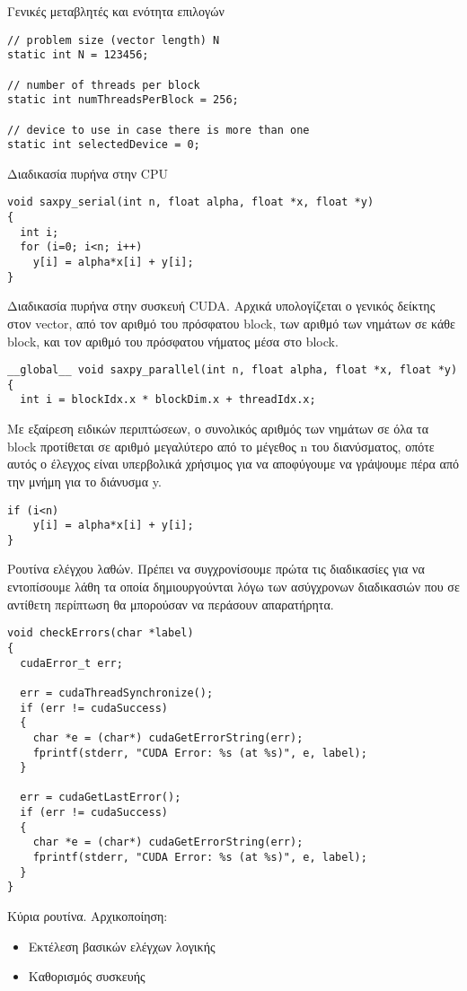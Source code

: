 Γενικές μεταβλητές και ενότητα επιλογών
\begin{lstlisting}[basicstyle=\scriptsize]
// problem size (vector length) N
static int N = 123456;

// number of threads per block
static int numThreadsPerBlock = 256;

// device to use in case there is more than one
static int selectedDevice = 0;

\end{lstlisting}
Διαδικασία πυρήνα στην CPU
\begin{lstlisting}[basicstyle=\scriptsize]
void saxpy_serial(int n, float alpha, float *x, float *y)
{
  int i;
  for (i=0; i<n; i++)
    y[i] = alpha*x[i] + y[i];
}
\end{lstlisting}
Διαδικασία πυρήνα στην συσκευή CUDA. Αρχικά υπολογίζεται ο γενικός δείκτης στον vector, από τον αριθμό του πρόσφατου block, των αριθμό των νημάτων σε κάθε block, και τον αριθμό του πρόσφατου νήματος μέσα στο block. 
\begin{lstlisting}[basicstyle=\scriptsize]
__global__ void saxpy_parallel(int n, float alpha, float *x, float *y)
{
  int i = blockIdx.x * blockDim.x + threadIdx.x;
\end{lstlisting}
Με εξαίρεση ειδικών περιπτώσεων, ο συνολικός αριθμός των νημάτων σε όλα τα block προτίθεται σε αριθμό μεγαλύτερο από το μέγεθος n του διανύσματος, οπότε αυτός ο έλεγχος είναι υπερβολικά χρήσιμος για να αποφύγουμε να γράψουμε πέρα από την μνήμη για το διάνυσμα y.
\begin{lstlisting}[basicstyle=\scriptsize]
  if (i<n)
    y[i] = alpha*x[i] + y[i];
}
\end{lstlisting}
Ρουτίνα ελέγχου λαθών. Πρέπει να συγχρονίσουμε πρώτα τις διαδικασίες για να εντοπίσουμε λάθη τα οποία δημιουργούνται λόγω των ασύγχρονων διαδικασιών που σε αντίθετη περίπτωση θα μπορούσαν να περάσουν απαρατήρητα.
\begin{lstlisting}[basicstyle=\scriptsize]
void checkErrors(char *label)
{
  cudaError_t err;

  err = cudaThreadSynchronize();
  if (err != cudaSuccess)
  {
    char *e = (char*) cudaGetErrorString(err);
    fprintf(stderr, "CUDA Error: %s (at %s)", e, label);
  }

  err = cudaGetLastError();
  if (err != cudaSuccess)
  {
    char *e = (char*) cudaGetErrorString(err);
    fprintf(stderr, "CUDA Error: %s (at %s)", e, label);
  }
}
\end{lstlisting}
Κύρια ρουτίνα. Αρχικοποίηση:
\begin{itemize}
	\item Εκτέλεση βασικών ελέγχων λογικής
	\item Καθορισμός συσκευής
\end{itemize} 

